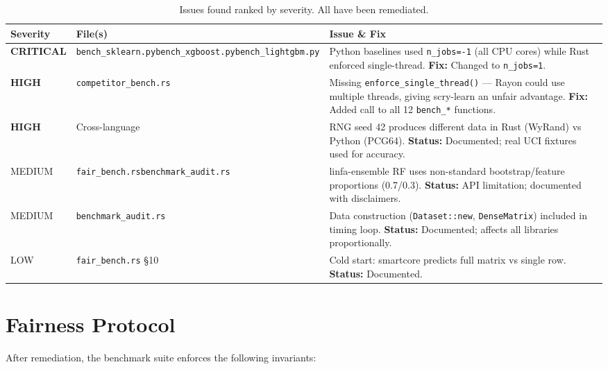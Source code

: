 \documentclass[11pt,a4paper]{article}
\begin{document}
\begin{table}[H]
\centering
\caption{Issues found ranked by severity. All have been remediated.}
\label{tab:issues}
\small
\begin{tabularx}{\textwidth}{llX}
\toprule
\textbf{Severity} & \textbf{File(s)} & \textbf{Issue \& Fix} \\
\midrule
\cellcolor{unfairred!20}\textbf{CRITICAL} &
\texttt{bench\_sklearn.py}\newline\texttt{bench\_xgboost.py}\newline\texttt{bench\_lightgbm.py} &
Python baselines used \texttt{n\_jobs=-1} (all CPU cores) while Rust
enforced single-thread. \textbf{Fix:} Changed to \texttt{n\_jobs=1}. \\
\midrule
\cellcolor{partialyellow!20}\textbf{HIGH} &
\texttt{competitor\_bench.rs} &
Missing \texttt{enforce\_single\_thread()} — Rayon could use multiple
threads, giving scry-learn an unfair advantage.
\textbf{Fix:} Added call to all 12 \texttt{bench\_*} functions. \\
\midrule
\cellcolor{partialyellow!20}\textbf{HIGH} &
Cross-language &
RNG seed 42 produces different data in Rust (WyRand) vs Python (PCG64).
\textbf{Status:} Documented; real UCI fixtures used for accuracy. \\
\midrule
MEDIUM &
\texttt{fair\_bench.rs}\newline\texttt{benchmark\_audit.rs} &
linfa-ensemble RF uses non-standard bootstrap/feature proportions
(0.7/0.3). \textbf{Status:} API limitation; documented with disclaimers. \\
\midrule
MEDIUM &
\texttt{benchmark\_audit.rs} &
Data construction (\texttt{Dataset::new}, \texttt{DenseMatrix}) included
in timing loop. \textbf{Status:} Documented; affects all libraries
proportionally. \\
\midrule
LOW &
\texttt{fair\_bench.rs} \S10 &
Cold start: smartcore predicts full matrix vs single row.
\textbf{Status:} Documented. \\
\bottomrule
\end{tabularx}
\end{table}

\section{Fairness Protocol}

After remediation, the benchmark suite enforces the following invariants:
\end{document}

